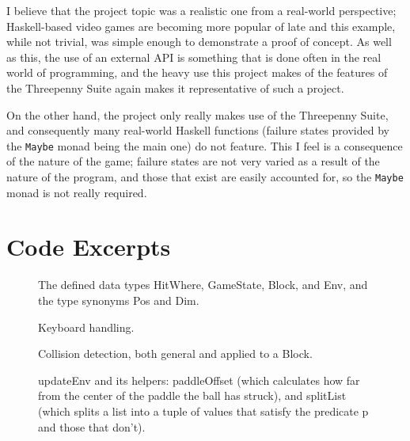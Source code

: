 \documentclass[12pt]{article}
\begin{document}
I believe that the project topic was a realistic one from a real-world perspective; Haskell-based video games are becoming more popular of late and this example, while not trivial, was simple enough to demonstrate a proof of concept.
As well as this, the use of an external API is something that is done often in the real world of programming, and the heavy use this project makes of the features of the Threepenny Suite again makes it representative of such a project.

\par

On the other hand, the project only really makes use of the Threepenny Suite, and consequently many real-world Haskell functions (failure states provided by the \verb|Maybe| monad being the main one) do not feature.
This I feel is a consequence of the nature of the game; failure states are not very varied as a result of the nature of the program, and those that exist are easily accounted for, so the \verb|Maybe| monad is not really required.

\pagebreak

\appendix

\section{Code Excerpts}

\begin{figure}[ht]
  \caption{The defined data types HitWhere, GameState, Block, and Env, and the type synonyms Pos and Dim.}
  
  \label{fig:datatypes}
\end{figure}

\begin{figure}[ht]
  \caption{Keyboard handling.}
  
  \label{fig:keyboardhandle}
\end{figure}

\begin{figure}[ht]
  \caption{Collision detection, both general and applied to a Block.}
  
  \label{fig:hitcheck}
\end{figure}

\begin{figure}[ht]
  \caption{updateEnv and its helpers: paddleOffset (which calculates how far from the center of the paddle the ball has struck), and splitList (which splits a list into a tuple of values that satisfy the predicate p and those that don't).}
  
  \label{fig:updateenv}
\end{figure}
\end{document}
